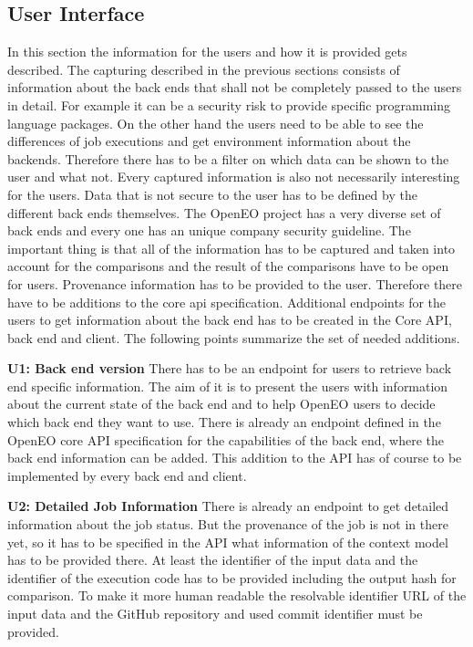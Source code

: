 \documentclass[draft,final]{vutinfth} %
\begin{document}
\subsection{User Interface}\label{Design:User Interface}
In this section the information for the users and how it is provided gets described. The capturing described in the previous sections consists of  information about the back ends that shall not be completely passed to the users in detail. For example it can be a security risk to provide specific programming language packages. On the other hand the users need to be able to see the differences of job executions and get environment information about the backends. Therefore there has to be a filter on which data can be shown to the user and what not. Every captured information is also not necessarily interesting for the users. Data that is not secure to the user has to be defined by the different back ends themselves. The OpenEO project has a very diverse set of back ends and every one has an unique company security guideline. The important thing is that all of the information has to be captured and taken into account for the comparisons and the result of the comparisons have to be open for users.
Provenance information has to be provided to the user. Therefore there have to be additions to the core api specification. Additional endpoints for the users to get information about the back end has to be created in the Core API, back end and client. The following points summarize the set of needed additions. 

\textbf{U1: Back end version}
There has to be an endpoint for users to retrieve back end specific information. The aim of it is to present the users with information about the current state of the back end and to help OpenEO users to decide which back end they want to use. There is already an endpoint defined in the OpenEO core API specification for the capabilities of the back end, where the back end information can be added. This addition to the API has of course to be implemented by every back end and client.

\textbf{U2: Detailed Job Information}
There is already an endpoint to get detailed information about the job status. But the provenance of the job is not in there yet, so it has to be specified in the API what information of the context model has to be provided there. At least the identifier of the input data and the identifier of the execution code has to be provided including the output hash for comparison. To make it more human readable the resolvable identifier URL of the input data and the GitHub repository and used commit identifier must be provided.   
\end{document}
